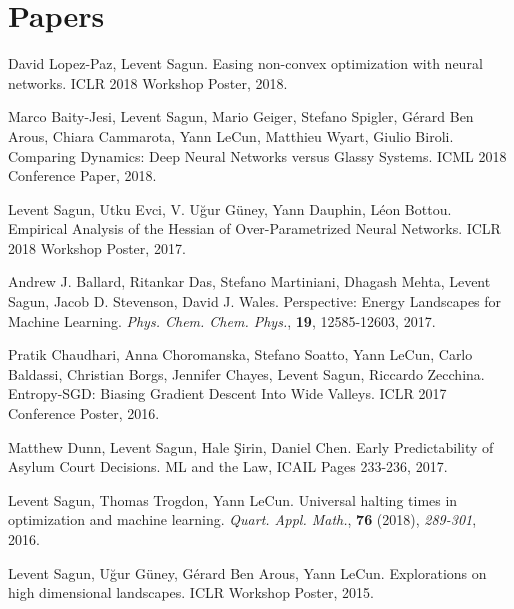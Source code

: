 \documentclass[10pt,letterpaper]{article}
\renewenvironment{itemize}
{
\begin{list}{}{\setlength{\leftmargin}{1.5em}}
}
{
  \end{list}
}
\begin{document}
\section*{Papers}
\begin{itemize}
\item David Lopez-Paz, Levent Sagun. Easing non-convex optimization with neural networks. ICLR 2018 Workshop Poster, 2018.

\item Marco Baity-Jesi, Levent Sagun, Mario Geiger, Stefano Spigler, G\'erard Ben Arous, Chiara Cammarota, Yann LeCun, Matthieu Wyart, Giulio Biroli. Comparing Dynamics: Deep Neural Networks versus Glassy Systems. ICML 2018 Conference Paper, 2018.

\item Levent Sagun, Utku Evci, V. U\u{g}ur G\"uney, Yann Dauphin, L\'eon Bottou. Empirical Analysis of the Hessian of Over-Parametrized Neural Networks. ICLR 2018 Workshop Poster, 2017.


\item Andrew J. Ballard, Ritankar Das, Stefano Martiniani, Dhagash Mehta, Levent Sagun, Jacob D. Stevenson, David J. Wales. Perspective: Energy Landscapes for Machine Learning. \textit{Phys. Chem. Chem. Phys.}, \textbf{19}, 12585-12603, 2017.

\item Pratik Chaudhari, Anna Choromanska, Stefano Soatto, Yann LeCun, Carlo Baldassi, Christian Borgs, Jennifer Chayes, Levent Sagun, Riccardo Zecchina. Entropy-SGD: Biasing Gradient Descent Into Wide Valleys. ICLR 2017 Conference Poster, 2016.

\item Matthew Dunn, Levent Sagun, Hale \c{S}irin, Daniel Chen. Early Predictability of Asylum Court Decisions. ML and the Law, ICAIL Pages 233-236, 2017.

\item  Levent Sagun, Thomas Trogdon, Yann LeCun. Universal halting times in optimization and machine learning. \textit{Quart. Appl. Math.}, \textbf{76} (2018), \textit{289-301}, 2016.

\item  Levent Sagun, U\u{g}ur G\"uney, G\'erard Ben Arous, Yann LeCun. Explorations on high dimensional landscapes. ICLR Workshop Poster, 2015.
\end{itemize}
\end{document}
